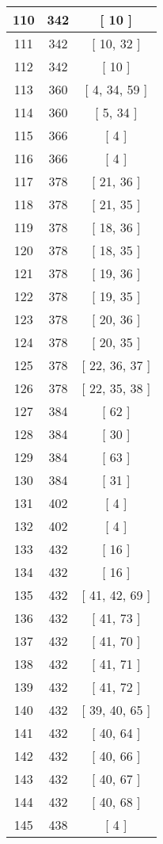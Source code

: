 \begin{center}
\begin{longtable}[H]{|| c c c ||}
\hline
110 & 342 & [ 10 ] \\ 
\hline
111 & 342 & [ 10, 32 ] \\ 
\hline
112 & 342 & [ 10 ] \\ 
\hline
113 & 360 & [ 4, 34, 59 ] \\ 
\hline
114 & 360 & [ 5, 34 ] \\ 
\hline
115 & 366 & [ 4 ] \\ 
\hline
116 & 366 & [ 4 ] \\ 
\hline
117 & 378 & [ 21, 36 ] \\ 
\hline
118 & 378 & [ 21, 35 ] \\ 
\hline
119 & 378 & [ 18, 36 ] \\ 
\hline
120 & 378 & [ 18, 35 ] \\ 
\hline
121 & 378 & [ 19, 36 ] \\ 
\hline
122 & 378 & [ 19, 35 ] \\ 
\hline
123 & 378 & [ 20, 36 ] \\ 
\hline
124 & 378 & [ 20, 35 ] \\ 
\hline
125 & 378 & [ 22, 36, 37 ] \\ 
\hline
126 & 378 & [ 22, 35, 38 ] \\ 
\hline
127 & 384 & [ 62 ] \\ 
\hline
128 & 384 & [ 30 ] \\ 
\hline
129 & 384 & [ 63 ] \\ 
\hline
130 & 384 & [ 31 ] \\ 
\hline
131 & 402 & [ 4 ] \\ 
\hline
132 & 402 & [ 4 ] \\ 
\hline
133 & 432 & [ 16 ] \\ 
\hline
134 & 432 & [ 16 ] \\ 
\hline
135 & 432 & [ 41, 42, 69 ] \\ 
\hline
136 & 432 & [ 41, 73 ] \\ 
\hline
137 & 432 & [ 41, 70 ] \\ 
\hline
138 & 432 & [ 41, 71 ] \\ 
\hline
139 & 432 & [ 41, 72 ] \\ 
\hline
140 & 432 & [ 39, 40, 65 ] \\ 
\hline
141 & 432 & [ 40, 64 ] \\ 
\hline
142 & 432 & [ 40, 66 ] \\ 
\hline
143 & 432 & [ 40, 67 ] \\ 
\hline
144 & 432 & [ 40, 68 ] \\ 
\hline
145 & 438 & [ 4 ] \\ 

\end{longtable}
\end{center}
